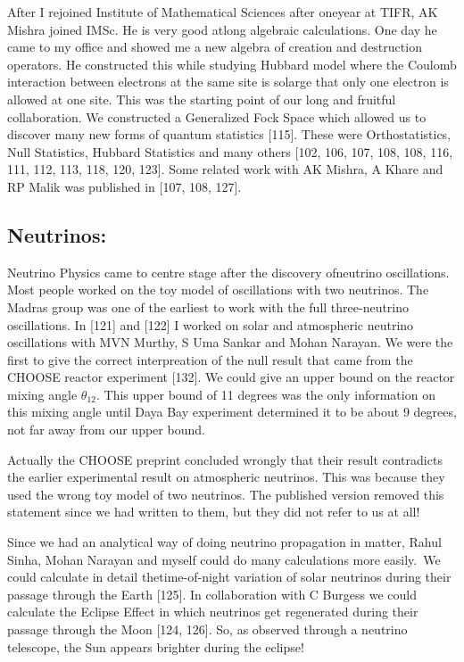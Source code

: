 After I rejoined Institute of Mathematical Sciences after one\break year at 
TIFR, AK Mishra joined IMSc. He is very good at\break long algebraic 
calculations. One day he came to my office and showed me a new algebra 
of creation and destruction operators. He constructed this while 
studying Hubbard model where the Coulomb interaction between electrons 
at the same site is so\break large that only one electron is allowed at one 
site. This was the starting point of our long and fruitful 
collaboration. We constru\-cted a Generalized Fock Space which allowed us 
to discover many new forms of quantum statistics [115]. These were 
Orthostatistics, Null Statistics, Hubbard Statistics and many others 
[102, 106, 107, 108, 108, 116, 111, 112, 113, 118, 120, 123]. Some related work 
with AK Mishra, A Khare and RP Malik was published in [107, 108, 127].

\vspace{-\topsep}
\subsection*{Neutrinos:}

Neutrino Physics came to centre stage after the discovery of\break neutrino 
oscillations. Most people worked on the toy model of oscillations with 
two neutrinos. The Madras group was one of the earliest to work with the 
full three-neutrino oscillations. In [121] and [122] I worked on solar 
and atmospheric neutrino osci\-llations with MVN Murthy, S Uma Sankar and 
Mohan Narayan. We were the first to give the correct interpreation of 
the null result that came from the CHOOSE reactor experiment [132]. We 
could give an upper bound on the reactor mixing angle $\theta_{12}$. This 
upper bound of 11 degrees was the only information on this mixing angle 
until Daya Bay experiment determined it to be about 9 degrees, not 
far away from our upper bound.
\newpage

Actually the CHOOSE preprint concluded wrongly that their result 
contradicts the earlier experimental result on atmospheric neutrinos. 
This was because they used the wrong toy model of two neutrinos. The 
published version removed this statement since we had written to them, 
but they did not refer to us at all!

Since we had an analytical way of doing neutrino propagation in matter, 
Rahul Sinha, Mohan Narayan and myself could do many calculations more 
easily.\ We could calculate in detail the\break time-of-night variation of 
solar neutrinos during their passage through the Earth [125]. In 
collaboration with C Burgess we could calculate the Eclipse Effect in 
which neutrinos get regene\-rated during their passage through the Moon 
[124, 126]. So, as observed through a neutrino telescope, the Sun 
appears brighter during the eclipse!

